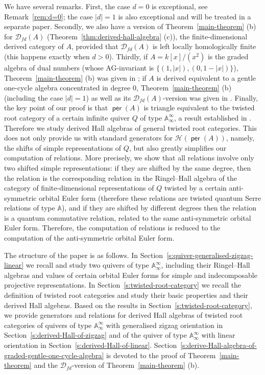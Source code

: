 \documentclass[reqno,12pt,a4paper]{amsart}
\theoremstyle{remark}
\theoremstyle{definition}
\newcommand{\opname}[1]{\operatorname{\mathsf{#1}}}
\newcommand{\per}{\opname{per}\nolimits}
\newcommand{\cd}{{\mathcal D}}
\newcommand{\ch}{{\mathcal H}}
\numberwithin{equation}{section}
\begin{document}
We have several remarks. First, the case $d=0$ is exceptional, see Remark~\ref{rem:d=0}; the case $|d|=1$ is also exceptional and will be treated in a separate paper. Secondly, we also have a version of Theorem~\ref{main-theorem} (b) for $\cd_{fd}(A)$ (Theorem~\ref{thm:derived-hall-algebra} (c)), the finite-dimensional derived category of $A$, provided that $\cd_{fd}(A)$ is left locally homologically finite (this happens exactly when $d>0$). Thirdly, if $A=k[x]/(x^2)$ is the graded algebra of dual numbers (whose AG-invariant is $\{(1,|x|),(0,1-|x|)\}$), Theorem~\ref{main-theorem} (b) was given in \cite{KellerYangZhou09}; if $A$ is derived equivalent to a gentle one-cycle algebra concentrated in degree $0$, Theorem~\ref{main-theorem} (b) (including the case $|d|=1$) as well as its $\cd_{fd}(A)$-version was given in \cite{BobinskiSchmude20}. Finally, the key point of our proof is that $\per(A)$ is triangle equivalent to the twisted root category of a certain infinite quiver $Q$ of type $\mathbb{A}_\infty^\infty$, a result established in \cite{ChenYang25}. Therefore we study derived Hall algebras of general twisted root categories. This does not only provide us with standard generators for $\ch(\per(A))$, namely, the shifts of simple representations of $Q$, but also greatly simplifies our computation of relations. More precisely, we show that all relations involve only two shifted simple representations: if they are shifted by the same degree, then the relation is the corresponding relation in the Ringel--Hall algebra of the category of finite-dimensional representations of $Q$ twisted by a certain anti-symmetric orbital Euler form (therefore these relations are twisted quantum Serre relations of type $\mathbb{A}$), and if they are shifted by different degrees then the relation is a quantum commutative relation, related to the same anti-symmetric orbital Euler form. Therefore, the computation of relations is reduced to the computation of the anti-symmetric orbital Euler form.


The structure of the paper is as follows. In Section~\ref{s:quiver-generalised-zigzag-linear} we recall and study two quivers of type $\mathbb{A}_\infty^\infty$, including their Ringel--Hall algebras and values of certain orbital Euler forms for simple and indecomposable projective representations. In Section~\ref{s:twisted-root-category} we recall the definition of twisted root categories and study their basic properties and their derived Hall algebras. Based on the results in Section~\ref{s:twisted-root-category}, we provide generators and relations for derived Hall algebras of twisted root categories of quivers of type $\mathbb{A}_\infty^\infty$ with generalised zigzag orientation in Section~\ref{s:derived-Hall-of-zigzag} and of the quiver of type $\mathbb{A}_\infty^\infty$ with linear orientation in Section~\ref{s:derived-Hall-of-linear}. Section~\ref{s:derive-Hall-algebra-of-graded-gentle-one-cycle-algebra} is devoted to the proof of Theorem~\ref{main-theorem}  and the $\cd_{fd}$-version of Theorem~\ref{main-theorem} (b).
\end{document}
